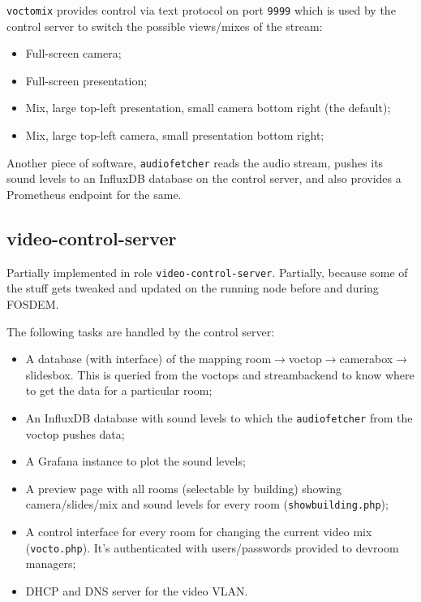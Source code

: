 \documentclass{article}
\begin{document}
\texttt{voctomix} provides control via text protocol on port \texttt{9999}
which is used by the control server to switch the possible views/mixes of the
stream:

\begin{itemize}
  \item Full-screen camera;
  \item Full-screen presentation;
  \item Mix, large top-left presentation, small camera bottom right (the default);
  \item Mix, large top-left camera, small presentation bottom right;
\end{itemize}

Another piece of software, \texttt{audiofetcher} reads the audio stream, pushes its sound levels to an InfluxDB database on the control server, and also provides a Prometheus endpoint for the same.

\subsection{video-control-server}

Partially implemented in role \texttt{video-control-server}. Partially, because some of the stuff gets tweaked and updated on the running node before and during FOSDEM.

The following tasks are handled by the control server:

\begin{itemize}
  \item A database (with interface) of the mapping room$\rightarrow$voctop$\rightarrow$camerabox$\rightarrow$slidesbox. This is queried from the voctops and streambackend to know where to get the data for a particular room;
  \item An InfluxDB database with sound levels to which the \texttt{audiofetcher} from the voctop pushes data;
  \item A Grafana instance to plot the sound levels;
  \item A preview page with all rooms (selectable by building) showing camera/slides/mix and sound levels for every room (\texttt{showbuilding.php});
  \item A control interface for every room for changing the current video mix (\texttt{vocto.php}). It's authenticated with users/passwords provided to devroom managers;
  \item DHCP and DNS server for the video VLAN.
\end{itemize}
\end{document}
